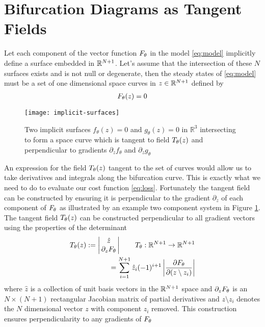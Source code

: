 \section{Bifurcation Diagrams as Tangent Fields}
\label{appendix:tangent-fields}

Let each component of the vector function $F_{\theta}$ in the model \eqref{eq:model} implicitly define a surface embedded in $\mathbb{R}^{N+1}$. Let's assume that the intersection of these $N$ surfaces exists and is not null or degenerate, then the steady states of \eqref{eq:model} must be a set of one dimensional space curves in $z\in\mathbb{R}^{N+1}$ defined by
\begin{align}
    F_{\theta}(z) = 0
\end{align}
\begin{figure}[H]
\centering
\texttt{[image: implicit-surfaces]}
\caption{Two implicit surfaces $f_{\theta}(z)=0$ and $g_{\theta}(z)=0$ in $\mathbb{R}^3$ intersecting to form a space curve which is tangent to field $T_{\theta}(z)$ and perpendicular to gradients $\partial_{z}f_{\theta}$ and $\partial_{z}g_{\theta}$}
\label{fig:implicit-surfaces}
\end{figure}
An expression for the field $T_{\theta}(z)$ tangent to the set of curves would allow us to take derivatives and integrals along the bifurcation curve. This is exactly what we need to do to evaluate our cost function \ref{eq:loss}. Fortunately the tangent field can be constructed by ensuring it is perpendicular to the gradient $\partial_z$ of each component of $F_{\theta}$ as illustrated by an example two component system in Figure \ref{fig:implicit-surfaces}. The tangent field $T_{\theta}(z)$ can be constructed perpendicular to all gradient vectors using the properties of the determinant \cite{Goldman2005CurvatureSurfaces}
\begin{align}
    T_{\theta}(z):=
    \label{eq:tangent-field}
    \left|\begin{matrix}
        \hat{z} \\
        \,\partial_{z}F_{\theta}\,
    \end{matrix}\right|
    \qquad T_{\theta} : \mathbb{R}^{N+1}\rightarrow\mathbb{R}^{N+1}\\
    =\sum_{i=1}^{N+1}\hat{z}_{i}(-1)^{i+1} \left|\frac{\partial F_{\theta}}{\partial(z\setminus z_{i}) }\right|
\end{align}
where $\hat{z}$ is a collection of unit basis vectors in the $\mathbb{R}^{N+1}$ space and $\partial_{z}F_{\theta}$ is an $N\times(N+1)$ rectangular Jacobian matrix of partial derivatives and $z\setminus z_{i}$ denotes the $N$ dimensional vector $z$ with component $z_{i}$ removed. This construction ensures perpendicularity to any gradients of $F_{\theta}$

